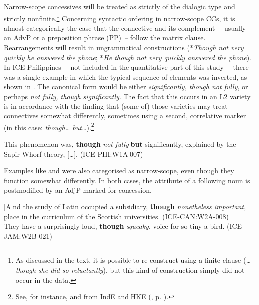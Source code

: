 Narrow-scope concessives will be treated as strictly of the dialogic type and strictly nonfinite.\footnote{As discussed in the text, it is possible to re-construct  using a finite clause (\textit{…though she did so reluctantly}), but this kind of construction simply did not occur in the data.} Concerning syntactic ordering in narrow-scope CCs, it is almost categorically the case that the connective and its complement~– usually an AdvP or a preposition phrase (PP)~– follow the matrix clause. Rearrangements will result in ungrammatical constructions (*\textit{Though not very quickly he answered the phone}; *\textit{He though not very quickly answered the phone}). In ICE-Philippines~– not included in the quantitative part of this study~– there was a single example in which the typical sequence of elements was inverted, as shown in . The canonical form would be either \textit{significantly, though not fully}, or perhaps \textit{not fully, though significantly}. The fact that this occurs in an L2 variety is in accordance with the finding that (some of) those varieties may treat connectives somewhat differently, sometimes using a second, correlative marker (in this case: \textit{though… but…}).\footnote{See, for instance,  and  from IndE and HKE (,  p. \pageref{bkm:Ref488839457}).}

\ea\label{ex:24}   \label{bkm:Ref496862678}This phenomenon was, \textbf{though} \textit{not fully} \textbf{but} significantly, explained by the Sapir-Whorf theory, […]. (ICE-PHI:W1A-007)\\
\z

\begin{sloppypar}
Examples like  and  were also categorised as narrow-scope, even though they function somewhat differently. In both cases, the attribute of a following noun is postmodified by an AdjP marked for concession.
\end{sloppypar}

\ea\label{ex:25}   \label{bkm:Ref496860631}[A]nd the study of Latin occupied a subsidiary, \textbf{though} \textit{nonetheless important}, place in the curriculum of the Scottish universities. (ICE-CAN:W2A-008)\\
    \ex\label{ex:26} \label{bkm:Ref496860632}They have a surprisingly loud, \textbf{though} \textit{squeaky}, voice for so tiny a bird. (ICE-JAM:W2B-021)\\
\z

